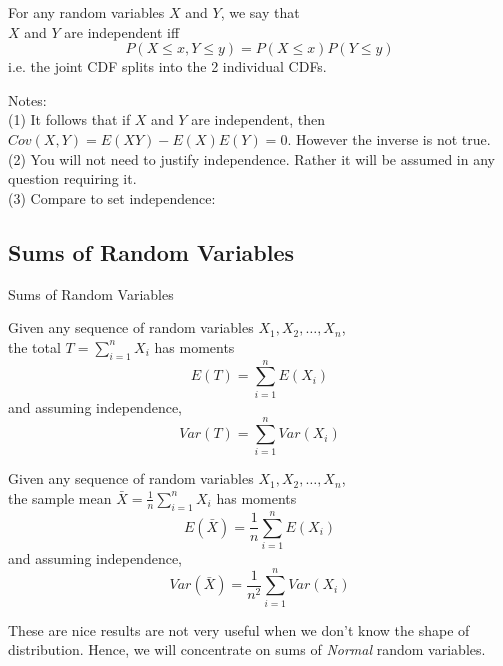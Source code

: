 \documentclass[t,xcolor=pdftex,dvipsnames,table]{beamer}\usepackage[]{graphicx}\usepackage[]{color}
\begin{document}
\begin{frame}{}
\begin{definition}
For any random variables $X$ and $Y$, we say that \\
$X$ and $Y$ are independent
iff
\[ P(X \leq x, Y \leq y) = P(X \leq x) P(Y \leq y) \]
i.e. the joint CDF splits into the 2 individual CDFs.
\end{definition}

\vspace{.5cm}
Notes: \\
(1) 
It follows that if $X$ and $Y$ are independent, then $Cov(X,Y) = E(XY) - E(X)E(Y) = 0$. However the inverse is not true. \\
(2) You will not need to justify independence. Rather it will be assumed in any question requiring it. \\
(3) Compare to set independence:
\hyperlink{Setindependence}{}
\end{frame}





\subsection[Sums]{Sums of Random Variables}

\begin{frame}{Sums of Random Variables}
\begin{definition}
Given any sequence of random variables $X_{1}, X_{2}, \ldots, X_{n}$, \\

the total $T = \sum_{i=1}^{n} X_{i}$ has moments
\[ \boxed{ E(T) = \sum_{i=1}^{n} E(X_{i})  } \]
and assuming independence,
\[ \boxed{ Var(T) = \sum_{i=1}^{n} Var(X_{i}) } \]

\end{definition}
\end{frame}

\begin{frame}{}
\begin{definition}
Given any sequence of random variables $X_{1}, X_{2}, \ldots, X_{n}$, \\

the sample mean $\bar{X} = \frac{1}{n} \sum_{i=1}^{n} X_{i}$ has moments
\[ \boxed{ E(\bar{X}) = \frac{1}{n} \sum_{i=1}^{n} E(X_{i}) } \]
and assuming independence,
\[ \boxed{ Var(\bar{X}) = \frac{1}{n^2} \sum_{i=1}^{n} Var(X_{i}) } \]
\end{definition}

These are nice results are not very useful when we don't know the shape of distribution. Hence, we will concentrate on sums of {\it Normal} random variables.
\end{frame}
\end{document}
